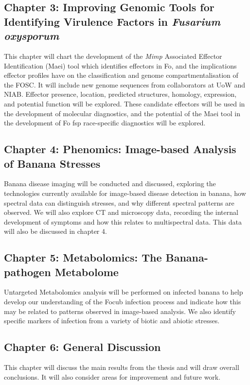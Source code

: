 \subsection{Chapter 3: Improving Genomic Tools for Identifying Virulence Factors in \textit{Fusarium oxysporum}} 

This chapter will chart the development of the \textit{Mimp} Associated Effector Identification (Maei) tool which identifies effectors in \acl{Fo}, and the implications effector profiles have on the classification and genome compartmentalisation of the FOSC. It will include new genome sequences from collaborators at UoW and NIAB. Effector presence, location, predicted structures, homology, expression, and potential function will be explored. 
These candidate effectors will be used in the development of molecular diagnostics, and the potential of the Maei tool in the development of \acl{Fo} \ac{fsp} race-specific diagnostics will be explored. 

\subsection{Chapter 4: Phenomics: Image-based Analysis of Banana Stresses}

Banana disease imaging will be conducted and discussed, exploring the technologies currently available for image-based disease detection in banana, how spectral data can distinguish stresses, and why different spectral patterns are observed. 
We will also explore CT and microscopy data, recording the internal development of symptoms and how this relates to multispectral data. This data will also be discussed in chapter 4. 

\subsection{Chapter 5: Metabolomics: The Banana-pathogen Metabolome}
Untargeted Metabolomics analysis will be performed on infected banana to help develop our understanding of the \acl{Focub} infection process and indicate how this may be related to patterns observed in image-based analysis. We also identify specific markers of infection from a variety of biotic and abiotic stresses. 

\subsection{Chapter 6: General Discussion}
This chapter will discuss the main results from the thesis and will draw overall conclusions. It will also consider areas for improvement and future work. 


 

 



 



 



 